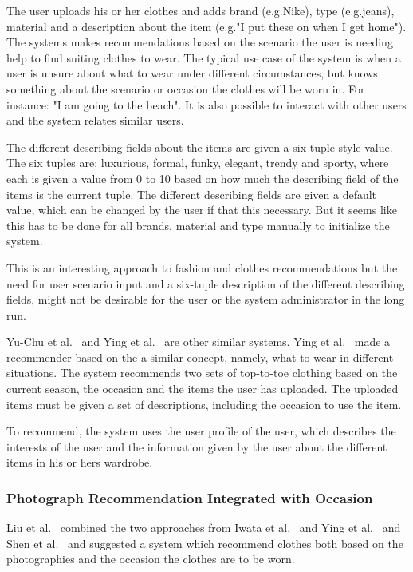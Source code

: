     The user uploads his or her clothes and adds brand (e.g.Nike), type (e.g.jeans), material and a description about the item (e.g."I put these on when I get home").
    The systems makes recommendations based on the scenario the user is needing help to find suiting clothes to wear.
    The typical use case of the system is when a user is unsure about what to wear under different circumstances, but knows something about the scenario or occasion the clothes will be worn in.
    For instance: "I am going to the beach".
    It is also possible to interact with other users and the system relates similar users.

    The different describing fields about the items are given a six-tuple style value.
    The six tuples are: luxurious, formal, funky, elegant, trendy and sporty, where each is given a value from 0 to 10 based on how much the describing field of the items is the current tuple.
    The different describing fields are given a default value, which can be changed by the user if that this necessary. But it seems like this has to be done for all brands, material and type manually to initialize the system.

    This is an interesting approach to fashion and clothes recommendations but the need for user scenario input and a six-tuple description of the different describing fields, might not be desirable for the user or the system administrator in the long run.

    Yu-Chu et al.~\cite{Yu-Chu:2012:PCS:2376365.2376961} and Ying et al.~\cite{Ying2011} are other similar systems. Ying et al.~\cite{Ying2011} made a recommender based on the a similar concept, namely, what to wear in different situations.
    The system recommends two sets of top-to-toe clothing based on the current season, the occasion and the items the user has uploaded.
    The uploaded items must be given a set of descriptions, including the occasion to use the item.

    To recommend, the system uses the user profile of the user, which describes the interests of the user and the information given by the user about the different items in his or hers wardrobe.

\subsubsection{Photograph Recommendation Integrated with Occasion} %
    \label{par:photograph_recommendation_integrated_with_occasion}
    Liu et al.~\cite{Liu:2012:HMC:2393347.2393433} combined the two approaches from Iwata et al.~\cite{Iwata:2011} and Ying et al.~\cite{Ying2011} and Shen et al.~\cite{Shen:2007:AIG:1216295.1216368} and suggested a system which recommend clothes both based on the photographies and the occasion the clothes are to be worn.

